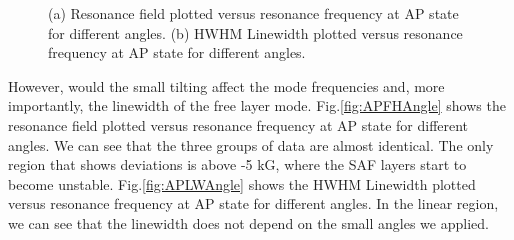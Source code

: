 \begin{figure}[!ht]
\centering
{}
\caption{(a) Resonance field plotted versus resonance frequency at AP state for different angles. (b) HWHM Linewidth plotted versus resonance frequency at AP state for different angles.}
\end{figure}

However, would the small tilting affect the mode frequencies and, more importantly, the linewidth of the free layer mode. Fig.\ref{fig:APFHAngle} shows the resonance field plotted versus resonance frequency at AP state for different angles. We can see that the three groups of data are almost identical. The only region that shows deviations is above -5 kG, where the SAF layers start to become unstable. Fig.\ref{fig:APLWAngle} shows the HWHM Linewidth plotted versus resonance frequency at AP state for different angles. In the linear region, we can see that the linewidth does not depend on the small angles we applied.

